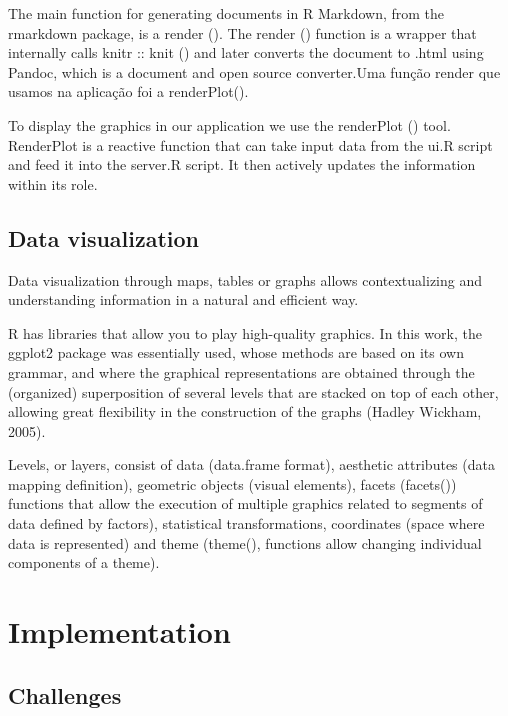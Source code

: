 \documentclass[11pt,a4paper]{report}
\begin{document}
The main function for generating documents in R Markdown, from the rmarkdown package, is a render ().
The render () function is a wrapper that internally calls knitr :: knit () and later converts the document to .html using Pandoc, which is a document and open source converter.Uma função render que usamos na aplicação foi a renderPlot().

To display the graphics in our application we use the renderPlot () tool. RenderPlot is a reactive function that can take input data from the ui.R script and feed it into the server.R script. It then actively updates the information within its role.



\subsection{Data visualization}
Data visualization through maps, tables or graphs allows contextualizing and understanding information in a natural and efficient way.


R has libraries that allow you to play high-quality graphics. In this work, the ggplot2 package was essentially used, whose methods are based on its own grammar, and where the graphical representations are obtained through the (organized) superposition of several levels that are stacked on top of each other, allowing great flexibility in the construction of the graphs (Hadley Wickham, 2005).


Levels, or layers, consist of data (data.frame format), aesthetic attributes (data mapping definition), geometric objects (visual elements), facets (facets()) functions that allow the execution of multiple graphics related to segments of data defined by factors), statistical transformations, coordinates (space where data is represented) and theme (theme(), functions allow changing individual components of a theme).





\section{Implementation}
\subsection{Challenges}
\end{document}
